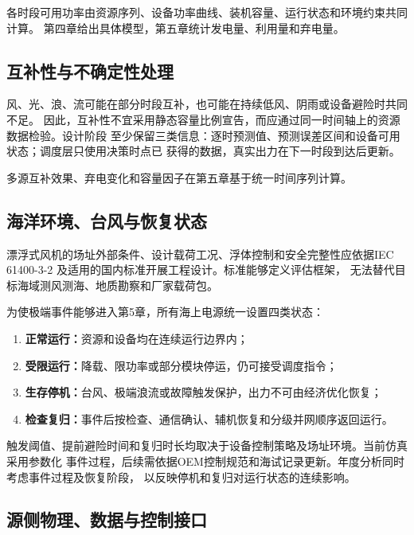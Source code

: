 各时段可用功率由资源序列、设备功率曲线、装机容量、运行状态和环境约束共同计算。
第四章给出具体模型，第五章统计发电量、利用量和弃电量。

\subsection{互补性与不确定性处理}

风、光、浪、流可能在部分时段互补，也可能在持续低风、阴雨或设备避险时共同不足。
因此，互补性不宜采用静态容量比例宣告，而应通过同一时间轴上的资源数据检验。设计阶段
至少保留三类信息：逐时预测值、预测误差区间和设备可用状态；调度层只使用决策时点已
获得的数据，真实出力在下一时段到达后更新。

多源互补效果、弃电变化和容量因子在第五章基于统一时间序列计算。

\subsection{海洋环境、台风与恢复状态}

漂浮式风机的场址外部条件、设计载荷工况、浮体控制和安全完整性应依据IEC 61400-3-2
及适用的国内标准开展工程设计\cite{iec61400-3-2,gbz44047}。标准能够定义评估框架，
无法替代目标海域测风测海、地质勘察和厂家载荷包。

为使极端事件能够进入第5章，所有海上电源统一设置四类状态：
\begin{enumerate}
  \item {\bfseries 正常运行：}资源和设备均在连续运行边界内；
  \item {\bfseries 受限运行：}降载、限功率或部分模块停运，仍可接受调度指令；
  \item {\bfseries 生存停机：}台风、极端浪流或故障触发保护，出力不可由经济优化恢复；
  \item {\bfseries 检查复归：}事件后按检查、通信确认、辅机恢复和分级并网顺序返回运行。
\end{enumerate}

触发阈值、提前避险时间和复归时长均取决于设备控制策略及场址环境。当前仿真采用参数化
事件过程，后续需依据OEM控制规范和海试记录更新。年度分析同时考虑事件过程及恢复阶段，
以反映停机和复归对运行状态的连续影响。

\subsection{源侧物理、数据与控制接口}

